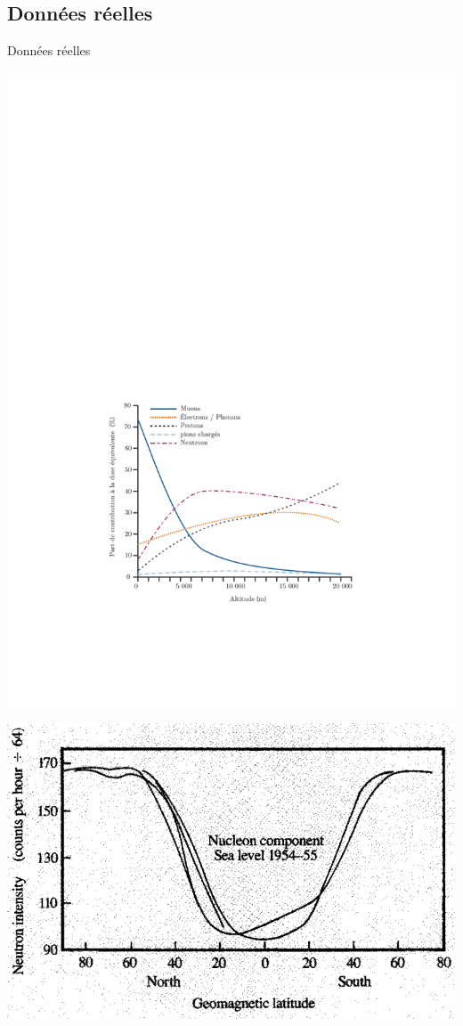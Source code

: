 \documentclass[french,bookmarks,aspectratio=43]{beamer}
\begin{document}
\subsection{Données réelles}

\begin{frame}{Données réelles}
    \begin{minipage}{0.4\linewidth}
        \includegraphics[scale=0.4]{../Images/unscear2008cosmic.pdf}
    \end{minipage}
    \begin{minipage}{0.1\linewidth}
        \hfill
    \end{minipage}\pause
    \begin{minipage}{0.4\linewidth}
        \includegraphics[scale=0.5]{../Images/latitude.png}

\end{minipage}
\end{frame}
\end{document}
